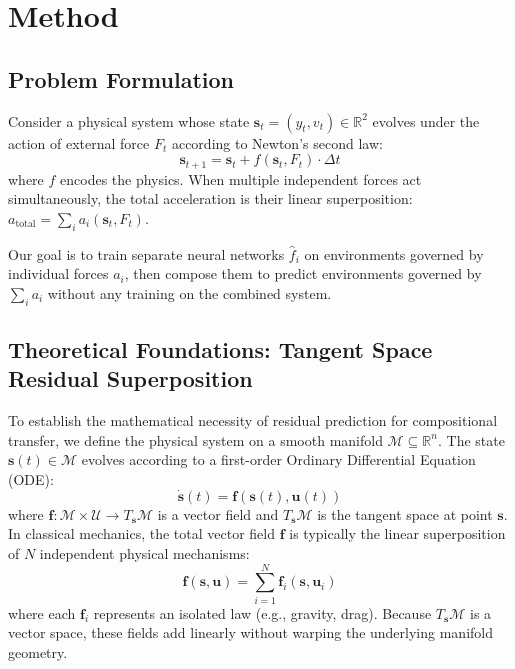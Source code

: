 \documentclass[twoside,11pt]{article}
\begin{document}
\section{Method}
\label{sec:method}

\subsection{Problem Formulation}

Consider a physical system whose state $\mathbf{s}_t = (y_t, v_t) \in \mathbb{R}^2$ evolves under the action of external force $F_t$ according to Newton's second law:
\begin{equation}
    \mathbf{s}_{t+1} = \mathbf{s}_t + f(\mathbf{s}_t, F_t) \cdot \Delta t
    \label{eq:dynamics}
\end{equation}
where $f$ encodes the physics. When multiple independent forces act simultaneously, the total acceleration is their linear superposition:
$a_{\text{total}} = \sum_i a_i(\mathbf{s}_t, F_t).$

Our goal is to train separate neural networks $\hat{f}_i$ on environments governed by individual forces $a_i$, then compose them to predict environments governed by $\sum_i a_i$ without any training on the combined system.

\subsection{Theoretical Foundations: Tangent Space Residual Superposition}
\label{sec:residual}

To establish the mathematical necessity of residual prediction for compositional transfer, we define the physical system on a smooth manifold $\mathcal{M} \subseteq \mathbb{R}^n$. The state $\mathbf{s}(t) \in \mathcal{M}$ evolves according to a first-order Ordinary Differential Equation (ODE):
\begin{equation}
    \dot{\mathbf{s}}(t) = \mathbf{f}(\mathbf{s}(t), \mathbf{u}(t))
\end{equation}
where $\mathbf{f}: \mathcal{M} \times \mathcal{U} \to T_\mathbf{s}\mathcal{M}$ is a vector field and $T_\mathbf{s}\mathcal{M}$ is the tangent space at point $\mathbf{s}$. In classical mechanics, the total vector field $\mathbf{f}$ is typically the linear superposition of $N$ independent physical mechanisms:
\begin{equation}
    \mathbf{f}(\mathbf{s}, \mathbf{u}) = \sum_{i=1}^N \mathbf{f}_i(\mathbf{s}, \mathbf{u}_i)
\end{equation}
where each $\mathbf{f}_i$ represents an isolated law (e.g., gravity, drag). Because $T_\mathbf{s}\mathcal{M}$ is a vector space, these fields add linearly without warping the underlying manifold geometry.
\end{document}
